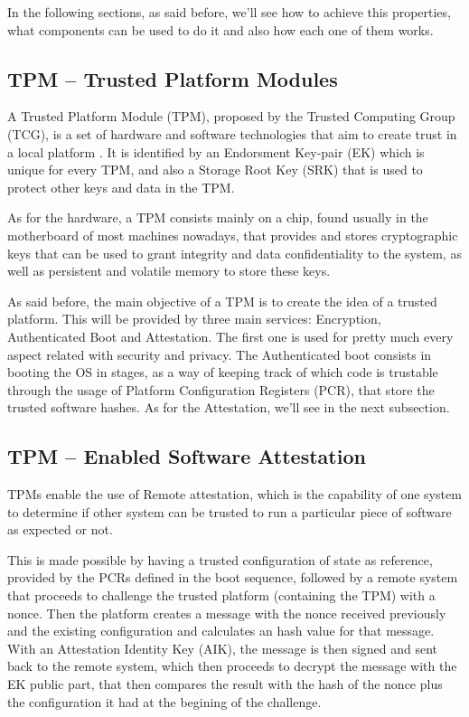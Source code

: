 In the following sections, as said before, we'll see how to achieve this properties, what components can be used to do it and also how each one of them works.

\subsection{TPM – Trusted Platform Modules }

A Trusted Platform Module (TPM), proposed by the Trusted Computing Group (TCG), is a set of hardware and software technologies that aim to create trust in a local platform \cite{sgxCloudThesis}. It is identified by an Endorsment Key-pair (EK) which is unique for every TPM, and also a Storage Root Key (SRK) that is used to protect other keys and data in the TPM. 

As for the hardware, a TPM consists mainly on a chip, found usually in the motherboard of most machines nowadays, that provides and stores cryptographic keys that can be used to grant integrity and data confidentiality to the system, as well as persistent and volatile memory to store these keys. 

As said before, the main objective of a TPM is to create the idea of a trusted platform. This will be  provided by three main services: Encryption, Authenticated Boot and Attestation. The first one is used for pretty much every aspect related with security and privacy. The Authenticated boot consists in booting the OS in stages, as a way of keeping track of which code is trustable through the usage of Platform Configuration Registers (PCR), that store the trusted software hashes. As for the Attestation, we'll see in the next subsection.


\subsection{TPM – Enabled Software Attestation}


TPMs enable the use of Remote attestation, which is the capability of one system to determine if other system can be trusted to run a particular piece of software as expected or not.

This is made possible by having a trusted configuration of state as reference, provided by the PCRs defined in the boot sequence, followed by a remote system that proceeds to challenge the trusted platform (containing the TPM) with a nonce. Then the platform creates a message with the nonce received previously and the existing configuration and calculates an hash value for that message. With an Attestation Identity Key (AIK), the message is then signed and sent back to the remote system, which then proceeds to decrypt the message with the EK public part, that then compares the result with the hash of the nonce plus the configuration it had at the begining of the challenge. 

